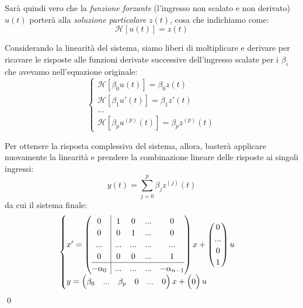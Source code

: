 \documentclass[a4paper,11pt]{article}
\begin{document}
Sarà quindi vero che la \textit{funzione forzante} (l'ingresso non scalato e non derivato) $u(t)$ porterà alla \textit{soluzione particolare} $z(t)$, cosa che indichiamo come:
$$
\mathcal{H}[u(t)] = z(t) 
$$

Considerando la linearità del sistema, siamo liberi di moltiplicare e derivare per ricavare le risposte alle funzioni derivate successive dell'ingresso scalate per i $\beta_i$ che avevamo nell'equazione originale:
\[
	\begin{cases}
		\mathcal{H}[\beta_0 u(t)] = \beta_0 z(t) \\ 
		\mathcal{H}[\beta_1 u'(t)] = \beta_1 z'(t) \\ 
		... \\
		\mathcal{H}[\beta_p u^{(p)}(t)] = \beta_p z^{(p)}(t)
	\end{cases}
\]

Per ottenere la risposta complessiva del sistema, allora, basterà applicare nuovamente la linearità e prendere la combinazione lineare delle risposte ai singoli ingressi:
$$
y(t) = \sum_{j = 0}^{p} \beta_j z^{(j)}(t)
$$
da cui il sistema finale:
\[
	\begin{cases}	
x' = \left(\begin{array}{@{}c | cccc@{}}
	0 & 1 & 0 & ... & 0 \\
	0 & 0 & 1 & ... & 0 \\
	... & ... & ... & ... & ... \\
	0 & 0 & 0 & ... & 1 \\
	\hline
	-\alpha_0 & ... & ... & ... & -\alpha_{n - 1}
\end{array}\right)
x + \begin{pmatrix}
0 \\
... \\
0 \\
1
\end{pmatrix} u \\ 
y = \begin{pmatrix}
	\beta_0 & ... & \beta_p & 0 & ... & 0
\end{pmatrix} x + \begin{pmatrix}
0
\end{pmatrix} u
	\end{cases}
\]
\qed
\end{document}
